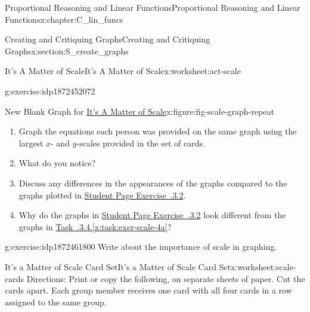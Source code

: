 \documentclass[oneside,10pt,]{book}
\newcommand{\xreffont}{\relax}
\numberwithin{equation}{chapter}
\begin{document}
\begin{chapterptx}{Proportional Reasoning and Linear Functions}{}{Proportional Reasoning and Linear Functions}{}{}{x:chapter:C_lin_funcs}
\begin{sectionptx}{Creating and Critiquing Graphs}{}{Creating and Critiquing Graphs}{}{}{x:section:S_create_graphs}
\begin{worksheet-subsection}{It's A Matter of Scale}{}{It's A Matter of Scale}{}{}{x:worksheet:act-scale}
\begin{divisionexercise}{4}{}{}{g:exercise:idp1872452072}
\begin{figureptx}{New Blank Graph for \hyperref[x:worksheet:act-scale]{It's A Matter of Scale}}{x:figure:fig-scale-graph-repeat}{}
\begin{image}{0.15}{0.7}{0.15}
\end{image}%
\tcblower
\end{figureptx}%
\begin{enumerate}[font=\bfseries,label=(\alph*),ref=\alph*]
\item\label{x:task:exer-scale-4a}Graph the equations each person was provided on the same graph using the largest \(x\)- and \(y\)-scales provided in the set of cards.%
\item{}What do you notice?%
\item{}Discuss any differences in the appearances of the graphs compared to the graphs plotted in \hyperlink{x:exercise:exer-scale-2}{Student Page Exercise~{\xreffont 2.2.3.2}}.%
\item{}Why do the graphs in \hyperlink{x:exercise:exer-scale-2}{Student Page Exercise~{\xreffont 2.2.3.2}} look different from the graphs in \hyperref[x:task:exer-scale-4a]{Task~{\xreffont 2.2.3.4}.{\xreffont\ref{x:task:exer-scale-4a}}}?%
\end{enumerate}
\end{divisionexercise}%
\begin{divisionexercise}{5}{}{}{g:exercise:idp1872461800}%
Write about the importance of scale in graphing.%
\end{divisionexercise}%
\end{worksheet-subsection}
\restoregeometry
%
%
\typeout{************************************************}
\typeout{************************************************}
%
\begin{worksheet-subsection}{It's a Matter of Scale Card Set}{}{It's a Matter of Scale Card Set}{}{}{x:worksheet:scale-cards}
Directions: Print or copy the following, on separate sheets of paper. Cut the cards apart. Each group member receives one card with all four cards in a row assigned to the same group.%
\begin{image}{0}{1}{0}%

\end{image}
\end{worksheet-subsection}
\end{sectionptx}
\end{chapterptx}
\end{document}
